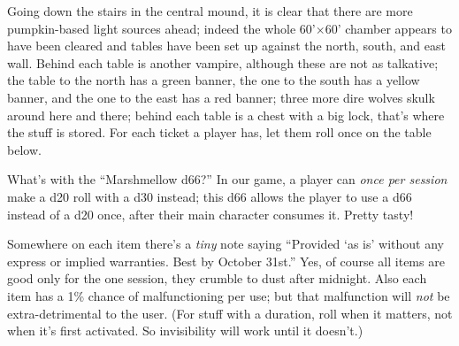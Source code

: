 Going down the stairs in the central mound, it is clear that there are more
pumpkin-based light sources ahead; indeed the whole 60'\(\times\)60' chamber
appears to have been cleared and tables have been set up against the north,
south, and east wall. Behind each table is another vampire, although these are
not as talkative; the table to the north has a green banner, the one to the
south has a yellow banner, and the one to the east has a red banner; three more
dire wolves skulk around here and there; behind each table is a chest with a
big lock, that's where the stuff is stored. For each ticket a player has, let
them roll once on the table below.

What's with the ``Marshmellow d66?'' In our game, a player can \emph{once per
session} make a d20 roll with a d30 instead; this d66 allows the player to use
a d66 instead of a d20 once, after their main character consumes it. Pretty tasty!

Somewhere on each item there's a \emph{tiny} note saying ``Provided `as is'
without any express or implied warranties. Best by October 31st.'' Yes, of
course all items are good only for the one session, they crumble to dust after
midnight. Also each item has a 1\% chance of malfunctioning per use; but that
malfunction will \emph{not} be extra-detrimental to the user. (For stuff with
a duration, roll when it matters, not when it's first activated. So invisibility
will work until it doesn't.)

